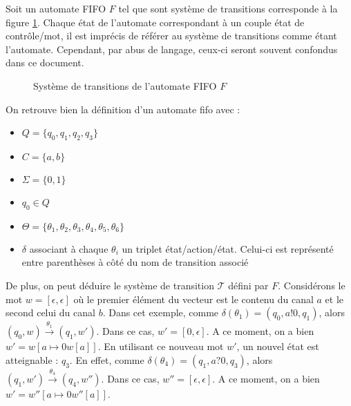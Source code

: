 \begin{example}
  Soit un automate FIFO $F$ tel que sont système de transitions corresponde à la figure \ref{fig:fifo1}. Chaque état de l'automate correspondant à un couple état de contrôle/mot, il est imprécis de référer au système de transitions comme étant l'automate. Cependant, par abus de langage, ceux-ci seront souvent confondus dans ce document.

  \begin{figure}[H]
    \centering
    \caption{Système de transitions de l'automate FIFO $F$}\label{fig:fifo1}
  \end{figure}

  On retrouve bien la définition d'un automate fifo \fifo avec :
  \begin{itemize}
    \item $Q=\{q_0,q_1,q_2,q_3\}$
    \item $C=\{a,b\}$
    \item $\Sigma=\{0,1\}$
    \item $q_0\in Q$
    \item $\Theta=\{\theta_1, \theta_2, \theta_3, \theta_4, \theta_5, \theta_6\}$
    \item $\delta$ associant à chaque $\theta_i$ un triplet état/action/état. Celui-ci est représenté entre parenthèses à côté du nom de transition associé
  \end{itemize}

  De plus, on peut déduire le système de transition $\mathcal{T}$ défini par $F$. Considérons le mot $w=[\epsilon,\epsilon]$ où le premier élément du vecteur est le contenu du canal $a$ et le second celui du canal $b$.
  Dans cet exemple, comme $\delta(\theta_1)=(q_0,a!0,q_1)$, alors $(q_0,w)\xrightarrow{\theta_1}(q_1,w')$. Dans ce cas, $w'=[0,\epsilon]$. A ce moment, on a bien $w'=w[a\mapsto 0w[a]]$.
  En utilisant ce nouveau mot $w'$, un nouvel état est atteignable : $q_3$. En effet, comme $\delta(\theta_4)=(q_1,a?0,q_3)$, alors $(q_1,w')\xrightarrow{\theta_4}(q_4,w'')$. Dans ce cas, $w''=[\epsilon,\epsilon]$. A ce moment, on a bien $w'=w''[a\mapsto 0w''[a]]$.


\end{example}
